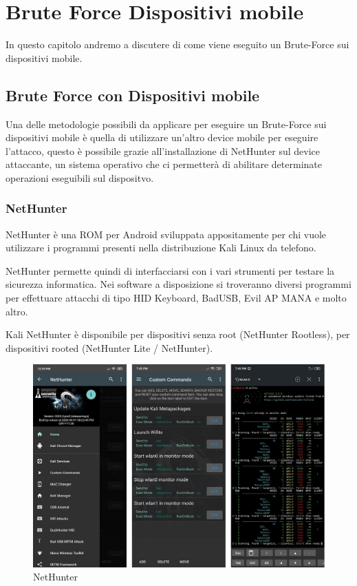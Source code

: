 \chapter{Brute Force Dispositivi mobile}
In questo capitolo andremo a discutere di come viene eseguito un Brute-Force sui dispositivi mobile.

\section{Brute Force con Dispositivi mobile}

Una delle metodologie possibili da applicare per eseguire un Brute-Force sui dispositivi mobile è quella di utilizzare un'altro device mobile per eseguire l'attacco, questo è possibile grazie all'installazione di NetHunter sul device attaccante, un sistema operativo che ci permetterà di abilitare determinate operazioni eseguibili sul dispositvo.

\subsection{NetHunter}

NetHunter\cite{NetHunter} è una ROM per Android sviluppata appositamente per chi vuole utilizzare i programmi presenti nella distribuzione Kali Linux da telefono.

NetHunter permette quindi di interfacciarsi con i vari strumenti per testare la sicurezza informatica. Nei software a disposizione si troveranno diversi programmi per effettuare attacchi di tipo HID Keyboard, BadUSB, Evil AP MANA e molto altro. 

Kali NetHunter è disponibile per dispositivi senza root (NetHunter Rootless), per dispositivi rooted (NetHunter Lite / NetHunter).

\begin{figure}[h!]
    \centering
    \includegraphics[width=116mm]{Immagini/3/nethunter_1.png}
    \caption{NetHunter}
    \label{fig:NetHunter}
\end{figure}

